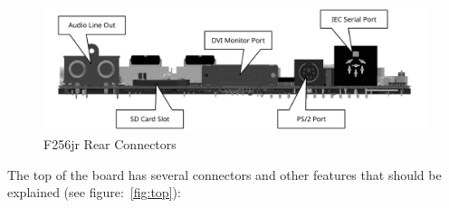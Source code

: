 \begin{figure}[ht]
    \begin{center}
        \includegraphics[scale=0.75]{images/f256_render_annotated_back.pdf}
    \end{center}
    \caption{F256jr Rear Connectors}
    \label{fig:rear}
\end{figure}

The top of the board has several connectors and other features that should be explained (see figure:~\ref{fig:top}):

